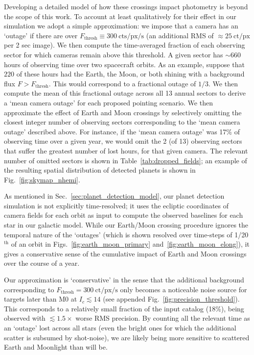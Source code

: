Developing a detailed model of how these crossings impact \tesss photometry is beyond the scope of this work.
To account at least qualitatively for their effect in our simulation we adopt a simple approximation: we impose that a camera has an `outage' if there are over $F_\text{thresh}\equiv300\ \text{cts/px/s}$ (an additional RMS of $\approx 25\ \mathrm{ct/px}$ per 2 sec image).
We then compute the time-averaged fraction of each observing sector for which \tesss cameras remain above this threshold. 
A given sector has $\sim660$ hours of observing time over two spacecraft orbits.
As an example, suppose that $220$ of these hours had the Earth, the Moon, or both shining with a background flux $F > F_\text{thresh}$. 
This would correspond to a fractional outage of $1/3$. 
We then compute the mean of this fractional outage across all 13 annual sectors to derive a `mean camera outage' for each proposed pointing scenario.
We then approximate the effect of Earth and Moon crossings by selectively omitting the closest integer number of observing sectors corresponding to the `mean camera outage' described above.
For instance, if the `mean camera outage' was 17\% of \tesss observing time over a given year, we would omit the 2 (of 13) observing sectors that suffer the greatest number of lost hours, for that given camera.
The relevant number of omitted sectors is shown in Table~\ref{tab:dropped_fields}; an example of the resulting spatial distribution of detected planets is shown in Fig.~\ref{fig:skymap_nhemi}.


As mentioned in Sec.~\ref{sec:planet_detection_model}, our planet detection simulation is not explicitly time-resolved; it uses the ecliptic coordinates of camera fields for each orbit as input to compute the observed baselines for each star in our galactic model.
While our Earth/Moon crossing procedure ignores the temporal nature of the `outages' (which is shown resolved over time-steps of 1/20$^\mathrm{th}$ of an orbit in Figs.~\ref{fig:earth_moon_primary} and~\ref{fig:earth_moon_elong}), it gives a conservative sense of the cumulative impact of Earth and Moon crossings over the course of a year.

Our approximation is `conservative' in the sense that the additional background corresponding to $F_\mathrm{thresh}=300\ \mathrm{ct/px/s}$ only becomes a noticeable noise source for targets later than M0 at $I_c \lesssim 14$ (see appended Fig.~\ref{fig:precision_threshold}).
This corresponds to a relatively small fraction of the input catalog (18\%), being observed with $\lesssim\! 1.5\times$ worse RMS precision.
By counting all the relevant time as an `outage' lost across all stars (even the bright ones for which the additional scatter is subsumed by shot-noise), we are likely being more sensitive to scattered Earth and Moonlight than \tess will be.

